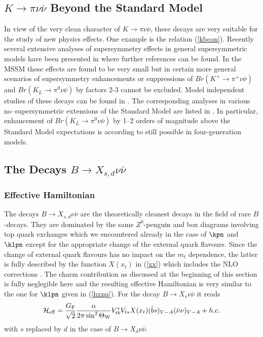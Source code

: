 \subsection{$K\to\pi\nu\bar\nu$ Beyond the Standard Model}
In view of the very clean character of $K\to\pi\nu\bar\nu$,
these decays are very suitable for the study of new physics
effects. One example is the relation (\ref{kbcon}). Recently
several extensive analyses of supersymmetry effects in general
supersymmetric models have been presented in \cite{NIR96,GN1,BRS}
where further references can be found. In the MSSM these
effects are found to be very small but in certain more 
general scenarios of supersymmetry enhancements or
suppressions of $Br(K^+\to\pi^+\nu\bar\nu)$ and
$Br(K_L\to\pi^0\nu\bar\nu)$ by factors 2-3 cannot be
excluded. 
Model independent studies of these decays
can be found in \cite{NIR96,BRS}. The corresponding analyses in
various no--supersymmetric extensions of the Standard Model are 
listed in \cite{KLBSM}.
In particular, enhancement of $Br(K_L\to\pi^0\nu\bar\nu)$
by 1--2 orders of magnitude above the Standard Model
expectations is according to \cite{HHW98} 
still possible in four-generation models.
\subsection{The Decays $B\to X_{s,d}\nu\bar\nu$}
            \label{sec:HeffRareKB:klpinn2}
\subsubsection{Effective Hamiltonian}
The decays $B\to X_{s,d}\nu\bar\nu$ are the theoretically
cleanest decays in the field of rare $B$-decays.
They are dominated by the same $Z^0$-penguin and box diagrams
involving top quark exchanges which we encountered already
in the case of $\kpn$ and $\klpn$ except for the appropriate
change of the external quark flavours. Since the change of external
quark flavours has no impact on the $m_t$ dependence,
the latter is fully described by the function $X(x_t)$ in
(\ref{xx}) which includes
the NLO corrections \cite{BB2}. The charm contribution as
discussed at the beginning of this section is fully neglegible
here and the resulting effective Hamiltonian is very similar to
the one for $\klpn$ given in (\ref{hxnu}). 
For the decay $B\to X_s\nu\bar\nu$ it reads
\begin{equation}\label{bxnu}
{\cal H}_{\rm eff} = {G_{\rm F}\over \sqrt 2} {\alpha \over
2\pi \sin^2 \Theta_{\rm W}} V^\ast_{tb} V_{ts}
X (x_t) (\bar bs)_{V-A} (\bar\nu\nu)_{V-A} + h.c.   
\end{equation}
with $s$ replaced by $d$ in the
case of $B\to X_d\nu\bar\nu$.
 
